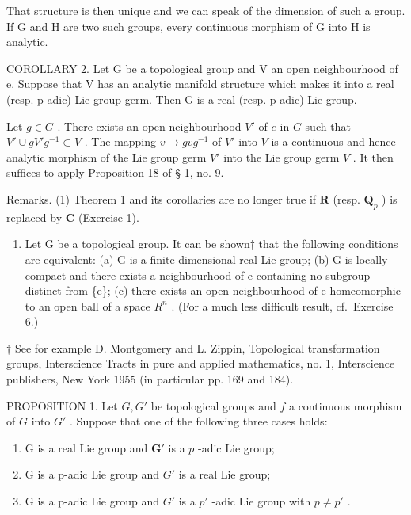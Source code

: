 That structure is then unique and we can speak of the dimension of such a group. If G and H are two such groups, every continuous morphism of G into H is analytic.

COROLLARY 2. Let G be a topological group and V an open neighbourhood of e. Suppose that V has an analytic manifold structure which makes it into a real (resp. p-adic) Lie group germ. Then G is a real (resp. p-adic) Lie group.

Let \(g \in G\) . There exists an open neighbourhood \(V'\) of \(e\) in \(G\) such that \(V' \cup gV'g^{-1} \subset V\) . The mapping \(v \mapsto gvg^{-1}\) of \(V'\) into \(V\) is a continuous and hence analytic morphism of the Lie group germ \(V'\) into the Lie group germ \(V\) . It then suffices to apply Proposition 18 of § 1, no. 9.

Remarks. (1) Theorem 1 and its corollaries are no longer true if \(\mathbf{R}\) (resp. \(\mathbf{Q}_p\) ) is replaced by \(\mathbf{C}\) (Exercise 1).

\begin{enumerate}
\def\labelenumi{(\arabic{enumi})}
\setcounter{enumi}{1}
\tightlist
\item
  Let G be a topological group. It can be shown† that the following conditions are equivalent: (a) G is a finite-dimensional real Lie group; (b) G is locally compact and there exists a neighbourhood of e containing no subgroup distinct from \{e\}; (c) there exists an open neighbourhood of e homeomorphic to an open ball of a space \(R^{n}\) . (For a much less difficult result, cf.~Exercise 6.)
\end{enumerate}
† See for example D. Montgomery and L. Zippin, Topological transformation groups, Interscience Tracts in pure and applied mathematics, no. 1, Interscience publishers, New York 1955 (in particular pp. 169 and 184).

PROPOSITION 1. Let \(G, G'\) be topological groups and \(f\) a continuous morphism of \(G\) into \(G'\) . Suppose that one of the following three cases holds:

\begin{enumerate}
\def\labelenumi{(\alph{enumi})}
\item
  G is a real Lie group and \(\mathbf{G}'\) is a \(p\) -adic Lie group;
\item
  G is a p-adic Lie group and \(G'\) is a real Lie group;
\item
  G is a p-adic Lie group and \(G'\) is a \(p'\) -adic Lie group with \(p \neq p'\) .
\end{enumerate}

